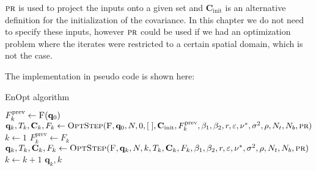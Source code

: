 $\textproc{pr}$ is used to project the inputs onto a given set and $\mathbf{C}_\mathrm{init}$ is an alternative definition for the initialization of the covariance. In this chapter we do not need to specify these inputs, however $\textproc{pr}$ could be used if we had an optimization problem where the iterates were restricted to a certain spatial domain, which is not the case.

The implementation in pseudo code is shown here:

\begin{algorithm}[H]%
\caption{\label{EnOptAlg}EnOpt algorithm}
\begin{algorithmic}[1]
\State $F^\mathrm{prev}_{k}\gets \Call{F}{\mathbf{q}_0}$
\State\label{EnOptAlgOptStepCall1} $\mathbf{q}_k,T_k,\mathbf{C}_k,F_k\gets\Call{OptStep}{\textproc{F},\mathbf{q}_0,N,0,[\;],\mathbf{C}_\mathrm{init},F^\mathrm{prev}_{k},\beta_1,\beta_2,r,\varepsilon,\nu^*,\sigma^2,\rho, N_t, N_b, \textproc{pr}}$
\State $k\gets 1$
\State $F^\mathrm{prev}_k\gets F_k$
\State\label{EnOptAlgOptStepCall2} $\mathbf{q}_{k},T_{k},\mathbf{C}_k,F_{k}\gets\Call{OptStep}{\textproc{F},\mathbf{q}_k,N,k,T_k,\mathbf{C}_k,F_k,\beta_1,\beta_2,r,\varepsilon,\nu^*,\sigma^2,\rho, N_t, N_b,\textproc{pr}}$
\State $k\gets k+1$
\EndWhile
\State \Return $\mathbf{q}_k, k$
\EndFunction
\end{algorithmic}
\end{algorithm}

